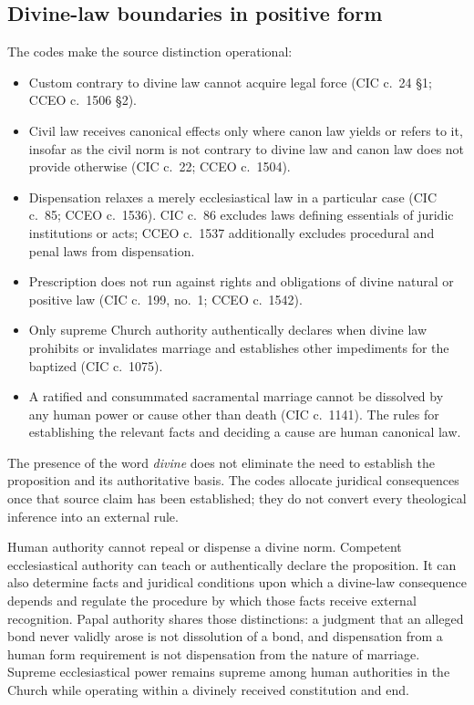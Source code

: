 \subsection{Divine-law boundaries in positive form}

The codes make the source distinction operational:

\begin{itemize}
\item Custom contrary to divine law cannot acquire legal force (CIC c.~24 \S1; CCEO c.~1506 \S2).
\item Civil law receives canonical effects only where canon law yields or refers to it, insofar as the civil norm is not contrary to divine law and canon law does not provide otherwise (CIC c.~22; CCEO c.~1504).
\item Dispensation relaxes a merely ecclesiastical law in a particular case (CIC c.~85; CCEO c.~1536). CIC c.~86 excludes laws defining essentials of juridic institutions or acts; CCEO c.~1537 additionally excludes procedural and penal laws from dispensation.
\item Prescription does not run against rights and obligations of divine natural or positive law (CIC c.~199, no.~1; CCEO c.~1542).
\item Only supreme Church authority authentically declares when divine law prohibits or invalidates marriage and establishes other impediments for the baptized (CIC c.~1075).
\item A ratified and consummated sacramental marriage cannot be dissolved by any human power or cause other than death (CIC c.~1141). The rules for establishing the relevant facts and deciding a cause are human canonical law.
\end{itemize}

The presence of the word \emph{divine} does not eliminate the need to establish the proposition and its authoritative basis. The codes allocate juridical consequences once that source claim has been established; they do not convert every theological inference into an external rule.

Human authority cannot repeal or dispense a divine norm. Competent ecclesiastical authority can teach or authentically declare the proposition. It can also determine facts and juridical conditions upon which a divine-law consequence depends and regulate the procedure by which those facts receive external recognition. Papal authority shares those distinctions: a judgment that an alleged bond never validly arose is not dissolution of a bond, and dispensation from a human form requirement is not dispensation from the nature of marriage. Supreme ecclesiastical power remains supreme among human authorities in the Church while operating within a divinely received constitution and end.

